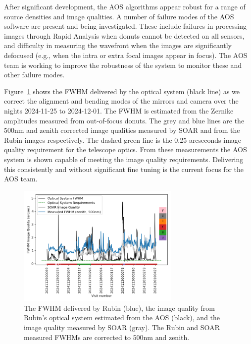 After significant development, the AOS algorithms appear robust for a range of source densities and image qualities. A number of failure modes of the AOS software are present and being investigated. These include failures in processing images through Rapid Analysis when donuts cannot be detected on all sensors, and difficulty in measuring the wavefront when the images are significantly defocused (e.g., when the intra or extra focal images appear in focus). The AOS team is working to improve the robustness of the system to monitor these and other failure modes.

Figure~\ref{fig:aos} shows the FWHM delivered by the optical system (black line) as we correct the alignment and bending modes of the mirrors and camera over the nights 2024-11-25 to 2024-12-01. The FWHM is estimated from the Zernike amplitudes measured from out-of-focus donuts. The grey and blue lines are the 500nm and zenith corrected image qualities measured by SOAR and from the Rubin images respectively. The dashed green line is the 0.25 arcseconds image quality requirement for the telescope optics. From these measurements the AOS system is shown capable of meeting the image quality requirements. Delivering this consistently and without significant fine tuning is the current focus for the AOS team.

\begin{figure}
    \centering \includegraphics[width=0.7\textwidth]{figures/optical_performance.png}
    \caption{The FWHM delivered by Rubin (blue), the image quality from Rubin's optical system estimated from the AOS (black), and the  image quality measured by SOAR (gray). The Rubin and SOAR measured FWHMs are corrected to 500nm and zenith.}
    \label{fig:aos}
\end{figure}


